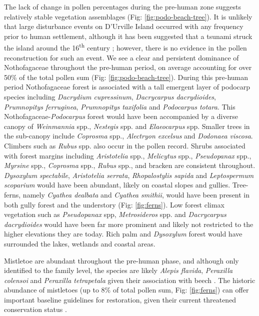 \documentclass{article}
\begin{document}
The lack of change in pollen percentages during the pre-human zone suggests relatively stable vegetation assemblages (Fig: \ref{fig:podo-beach-tree}). It is unlikely that large disturbance events on D'Urville Island occurred with any frequency prior to human settlement, although it has been suggested that a tsunami struck the island around the 16\textsuperscript{th} century \citep{mitchell2007history}; however, there is no evidence in the pollen reconstruction for such an event.  We see a clear and persistent dominance of Nothofagaceae  throughout the pre-human period, on average accounting for over 50\% of the total pollen sum (Fig: \ref{fig:podo-beach-tree}). During this pre-human period Nothofagaceae forest is associated with a tall emergent layer of podocarp species including \textit{Dacrydium cupressinum}, \textit{Dacrycarpus dacrydioides}, \textit{Prumnopitys ferruginea}, \textit{Prumnopitys taxifolia} and \textit{Podocarpus totara}.  This Nothofagaceae-\textit{Podocarpus} forest would have been accompanied by a diverse canopy of \textit{Weinmannia} spp., \textit{Nestegis} spp. and \textit{Elaeocarpus} spp.  Smaller trees in the sub-canopy include \textit{Coprosma} spp., \textit{Alectryon excelsus} and \textit{Dodonaea viscosa}.  Climbers such as \textit{Rubus} spp. also occur in the pollen record.  Shrubs associated with forest margins including \textit{Aristotelia} spp., \textit{Melicytus} spp., \textit{Pseudopanax} spp., \textit{Myrsine } spp., \textit{Coprosma} spp., \textit{Rubus} spp., and bracken are consistent throughout.  \textit{Dysoxylum spectabile}, \textit{Aristotelia serrata}, \textit{Rhopalostylis sapida} and \textit{Leptospermum scoparium} would have been abundant, likely on coastal slopes and gullies. Tree-ferns, namely \textit{Cyathea dealbata} and \textit{Cyathea smithii}, would have been present in both gully forest and the understory (Fig: \ref{fig:ferns}).  Low forest climax vegetation such as \textit{Pseudopanax} spp, \textit{Metrosideros} spp. and \textit{Dacrycarpus dacrydioides} would have been far more prominent and likely not restricted to the higher elevations they are today.  Rich palm and \textit{Dysoxylum} forest would have surrounded the lakes, wetlands and coastal areas.  

Mistletoe are abundant throughout the pre-human phase, and although only identified to the family level, the species are likely \textit{Alepis flavida}, \textit{Peraxilla colensoi} and \textit{Peraxilla tetrapetala} given their association with beech \citep{norton1999host}.  The historic abundance of mistletoes (up to 8\% of total pollen sum, Fig: \ref{fig:ferns}) can offer important baseline guidelines for restoration, given their current threatened conservation status \citep{sweetapple2002mistletoe}.    
\end{document}
